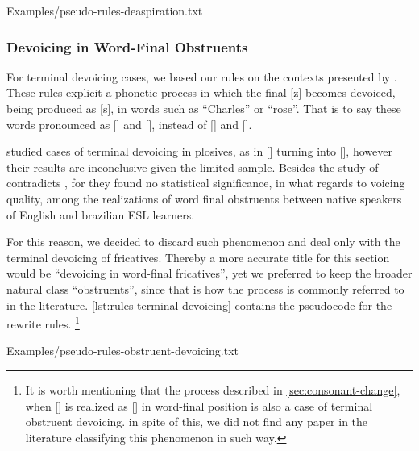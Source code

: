 %
    {Examples/pseudo-rules-deaspiration.txt}
    
    
\clearpage
\subsubsection{Devoicing in Word-Final Obstruents}

For terminal devoicing cases, we based our rules on the contexts presented by \citeauthor{Castilho2004} \citep{Castilho2004}.
These rules explicit a phonetic process in which the final [z] becomes devoiced, being produced as [s], in words such as ``Charles'' 
or ``rose''. That is to say these words pronounced as [] and [], instead of [] 
and [].

\citeauthor{Albuquerque2011} \citep{Albuquerque2011} studied cases of terminal devoicing in plosives, as in [] 
turning into [], however their results are inconclusive given the limited sample. 
Besides the study of \citeauthor{Zimmer2012} contradicts \citeauthor{Albuquerque2011} \citep{Albuquerque2011}, for they found 
no statistical significance, in what regards to voicing quality, among the realizations of word final obstruents
between native speakers of English and brazilian \ac{ESL} learners.

For this reason, we decided to discard such phenomenon and deal only with the terminal devoicing of fricatives.
Thereby a more accurate title for this section would be ``devoicing in word-final fricatives'', yet we 
preferred to keep the broader natural class ``obstruents'', since that is how the process is commonly referred to in the literature. 
\autoref{lst:rules-terminal-devoicing} contains the pseudocode for the rewrite rules.
\footnote{It is worth mentioning that the process described in \autoref{sec:consonant-change}, when [] is realized as
[] in word-final position is also a case of terminal obstruent devoicing. in spite of this, we did not
find any paper in the literature classifying this phenomenon in such way.}

%
    {Examples/pseudo-rules-obstruent-devoicing.txt}

\clearpage    
